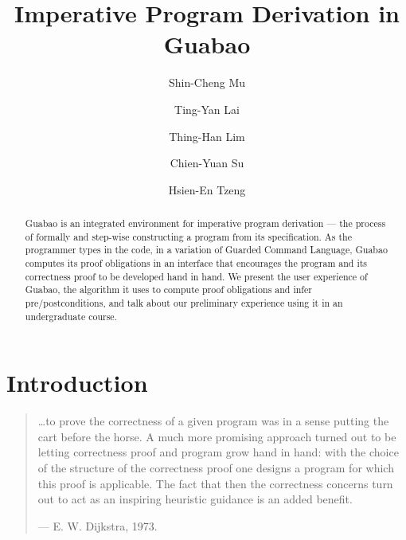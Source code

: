 \documentclass[runningheads]{llncs}
\begin{document}
\title{Imperative Program Derivation in Guabao
}

\author{Shin-Cheng Mu%
\and
Ting-Yan Lai\and
Thing-Han Lim\and
Chien-Yuan Su\and
Hsien-En Tzeng%
}
%



\maketitle              %
%
\begin{abstract}

Guabao is an integrated environment for imperative program derivation --- the process of formally and step-wise constructing a program from its specification.
As the programmer types in the code, in a variation of Guarded Command Language,
Guabao computes its proof obligations in an interface that encourages the program and its correctness proof to be developed hand in hand.
We present the user experience of Guabao, the algorithm it uses to compute proof obligations and infer pre/postconditions, and talk about our preliminary experience using it in an undergraduate course.

\end{abstract}

\section{Introduction}

\begin{quote}
\ldots to prove the correctness of a given program was in a sense putting the cart before the horse. A much more promising approach turned out to be letting correctness proof and program grow hand in hand: with the choice of the structure of the correctness proof one designs a program for which this proof is applicable. The fact that then the correctness concerns turn out to act as an inspiring heuristic guidance is an added benefit.
\begin{flushright}
--- E. W. Dijkstra, 1973. \cite{Dijkstra:74:Programming}
\end{flushright}
\end{quote}
\end{document}
